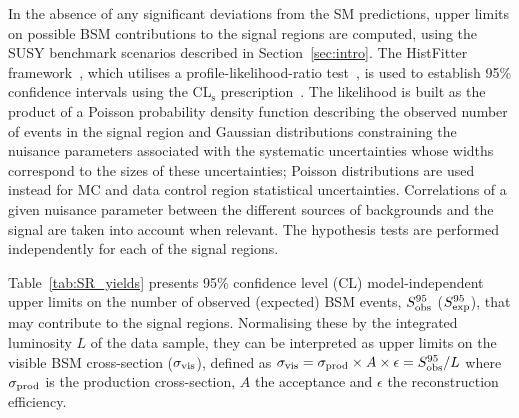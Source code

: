 In the absence of any significant deviations from the SM predictions, upper limits on possible BSM contributions to the signal regions are computed, using the SUSY benchmark scenarios described in Section~\ref{sec:intro}. 
The HistFitter framework~\cite{Baak:2014wma}, which utilises a profile-likelihood-ratio test~\cite{Cowan:2010js}, 
is used to establish 95\% confidence intervals using the CL$_\mathrm{s}$ prescription~\cite{Read_CLs}. 
The likelihood is built as the product of a Poisson probability density function describing the observed number of events in the signal region 
and Gaussian distributions constraining the nuisance parameters 
associated with the systematic uncertainties whose widths correspond to the sizes of these uncertainties; 
Poisson distributions are used instead for MC and data control region statistical uncertainties.
Correlations of a given nuisance parameter between the different sources of backgrounds and the signal are taken into account when relevant. 
The hypothesis tests are performed independently for each of the signal regions. 

Table~\ref{tab:SR_yields} presents 95\% confidence level (CL) model-independent upper limits 
on the number of observed (expected) BSM events, $S_{\rm obs}^{95}$ ($S_{\rm exp}^{95}$), that may contribute to the signal regions. 
Normalising these by the integrated luminosity $L$ of the data sample, they can be interpreted as upper limits on the visible 
BSM cross-section ($\sigma_{\rm{vis}}$), 
defined as $\sigma_{\rm{vis}}=\sigma_{\rm{prod}}\times A \times\epsilon=S_{\rm obs}^{95}/L$ where $\sigma_{\rm{prod}}$ is the production cross-section, 
$A$ the acceptance and $\epsilon$ the reconstruction efficiency. 


